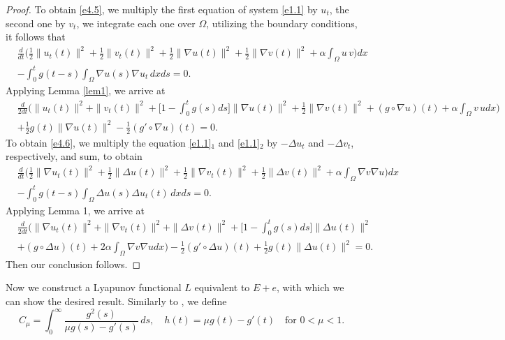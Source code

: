 \documentclass[11pt]{article}
\numberwithin{equation}{section}
\begin{document}
\begin{proof}
To obtain \eqref{e4.5}, we multiply the first equation of system \eqref{e1.1} by
$u_{t}$, the second one by $v_{t}$, we integrate each one over $\Omega$, utilizing
the boundary conditions, it follows that
\begin{align*}
&\frac{d}{dt} \Big( \frac{1}{2} \| u_{t}(t) \|^2 +\frac{1}{2} \| v_{t}(t) \|^2
+\frac{1}{2} \| \nabla u(t) \|^2 +\frac{1}{2} \| \nabla v(t) \|^2
 + \alpha \int_{\Omega} u\,v \Big) dx\\
&- \int_0^t g(t-s) \int_{\Omega} \nabla u(s) \nabla u_{t} \, dx ds =0.
\end{align*}
Applying Lemma \ref{lem1}, we arrive at
 \begin{align*}
&\frac{d}{2dt} \Big( \| u_{t}(t) \|^2 +\| v_{t}(t) \|^2
 + \Big[ 1-\int_0^t g(s) ds \Big] \| \nabla u(t) \|^2
 +\frac{1}{2} \| \nabla v(t) \|^2+ (g\circ \nabla u)(t)
 +\alpha \int_{\Omega} v \, u dx \Big) \\
& +\frac{1}{2} g(t)\parallel \nabla u(t) \parallel^2
- \frac{1}{2}( g'\circ\nabla u) (t) =0.
 \end{align*}
 To obtain \eqref{e4.6}, we multiply the equation \eqref{e1.1}$_1$ and
 \eqref{e1.1}$_2$ by $-\Delta u_t$ and $-\Delta v_t$, respectively,
and sum, to obtain
 \begin{align*}
&\frac{d}{dt}  \Big( \frac{1}{2} \| \nabla u_{t}(t) \|^2 + \frac{1}{2} \| \Delta u(t) \|^2 + \frac{1}{2}\| \nabla v_{t}(t) \|^2+ \frac{1}{2} \| \Delta v(t) \|^2 + \alpha \int_{\Omega} \nabla v \nabla u \Big) dx \\ 
& - \int_0^t g(t-s) \int_{\Omega} \Delta u(s) \Delta u_{t}(t) \, dx ds =0.
 \end{align*}
 Applying Lemma 1, we arrive at
\begin{align*}
&\frac{d}{2dt} \Big( \| \nabla u_t(t) \|^2+\| \nabla v_t(t) \|^2
+ \| \Delta v(t) \|^2 +\Big[ 1- \int_0^t g(s) ds \Big] \| \Delta u(t) \|^2 \\
& + (g \circ \Delta u)(t)+ 2 \alpha \int_{\Omega}\nabla v \nabla u dx\Big)
-\frac{1}{2}(g' \circ \Delta u)(t)+\frac{1}{2} g(t) \| \Delta u(t) \|^2=0.
\end{align*}
Then our conclusion follows.
\end{proof}

Now we construct a Lyapunov functional $L$ equivalent to $E+e$, with which we can
show the desired result.
Similarly to \cite{JKJT}, we define
\[
 C_\mu = \int_0^{\infty} \frac{g^2(s)}{\mu g(s) - g'(s)} \, ds, \quad
 h(t) = \mu g(t) - g'(t)\quad
 \text{for } 0<\mu <1.
\]
\end{document}
